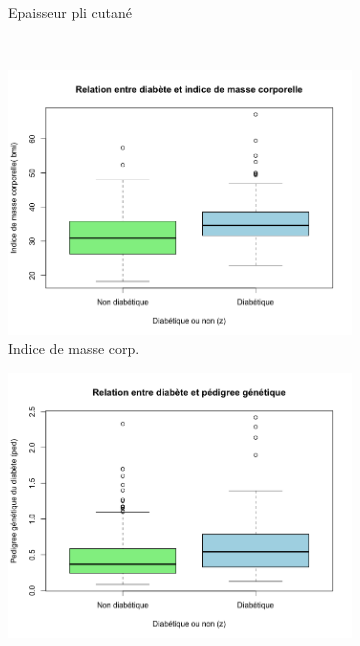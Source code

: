 \documentclass[a4paper,11pt]{report}
\begin{document}
\begin{figure}[H]
\begin{subfigure}[b]{0.25\linewidth}
		\caption{\scriptsize Epaisseur pli cutané}
		\label{fig:1-3-2-boxplot-diabete-pli-cutane}
	\end{subfigure}%
	\\
	\begin{subfigure}[b]{0.25\linewidth}
		\centering
		\captionsetup{justification=centering}
		\includegraphics[width=1\linewidth]{img/1-3-2-boxplot-diabete-indice-masse-corp}
		\caption{\scriptsize Indice de masse corp.}
		\label{fig:1-3-2-boxplot-diabete-indice-masse-corp}
	\end{subfigure}%
	\begin{subfigure}[b]{0.25\linewidth}
		\centering
		\captionsetup{justification=centering}
		\includegraphics[width=1\linewidth]{img/1-3-2-boxplot-diabete-pedigree}

\end{subfigure}
\end{figure}
\end{document}
